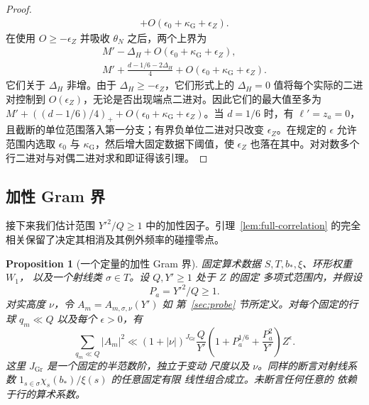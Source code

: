 \documentclass[11pt,a4paper]{article}
\numberwithin{equation}{section}
\numberwithin{figure}{section}
\newtheorem{proposition}[theorem]{Proposition}
\theoremstyle{definition}
\theoremstyle{remark}
\begin{document}
\begin{proof}
\[\begin{aligned}
       +O(\epsilon_0+\kappa_{\mathrm G}+\epsilon_Z).
 \end{aligned}
\]
在使用 $O\ge-\epsilon_Z$ 并吸收 $\theta_N$ 之后，两个上界为
\[
 \begin{gathered}
 M'-\Delta_H+O(\epsilon_0+\kappa_{\mathrm G}+\epsilon_Z),\\
 M'+\frac{d-1/6-2\Delta_H}{4}
       +O(\epsilon_0+\kappa_{\mathrm G}+\epsilon_Z).
 \end{gathered}
\]
它们关于 $\Delta_H$ 非增。由于 $\Delta_H\ge-\epsilon_Z$，它们形式上的 $\Delta_H=0$ 值将每个实际的二进对控制到 $O(\epsilon_Z)$，无论是否出现端点二进对。因此它们的最大值至多为 $M'+((d-1/6)/4)_++O(\epsilon_0+\kappa_{\mathrm G}+\epsilon_Z)$。当 $d=1/6$ 时，有 $\ell'=z_a=0$，且截断的单位范围落入第一分支；有界负单位二进对只改变 $\epsilon_Z$。在规定的 $\epsilon$ 允许范围内选取 $\epsilon_0$ 与 $\kappa_{\mathrm G}$，然后增大固定数据下阈值，使 $\epsilon_Z$ 也落在其中。对对数多个行二进对与对偶二进对求和即证得该引理。
\end{proof}

\subsection{加性 Gram 界}

接下来我们估计范围 $Y'^2/Q\ge1$ 中的加性因子。引理~\ref{lem:full-correlation} 的完全相关保留了决定其相消及其例外频率的碰撞零点。\begin{proposition}[一个定量的加性 Gram 界]\label{prop:probe-gram}
固定算术数据 $S,T,b_*,\xi$、环形权重 $W_1$，
以及一个射线类 $\sigma\in T$。设 $Q,Y'\ge1$ 处于 $Z$ 的固定
多项式范围内，并假设
\[
 P_a=Y'^2/Q\ge1.
\]
对实高度 $\nu$，令 $A_m=A_{m,\sigma,\nu}(Y')$ 如
第~\ref{sec:probe} 节所定义。对每个固定的行球 $q_m\ll Q$ 以及每个
$\epsilon>0$，有
\begin{equation}
 \sum_{q_m\ll Q}|A_m|^2
 \ll (1+|\nu|)^{J_{\mathrm{Gr}}}\frac Q{Y'}
       \left(1+P_a^{1/6}+\frac{P_a^2}{Y'}\right)Z^\epsilon.
 \label{eq:gram-quantitative}
\end{equation}
这里 $J_{\mathrm{Gr}}$ 是一个固定的半范数阶，独立于变动
尺度以及 $\nu$。同样的断言对射线系数
$1_{s\in\sigma}\chi_s(b_*)/\xi(s)$ 的任意固定有限
线性组合成立。未断言任何任意的
依赖于行的算术系数。
\end{proposition}
\end{document}
